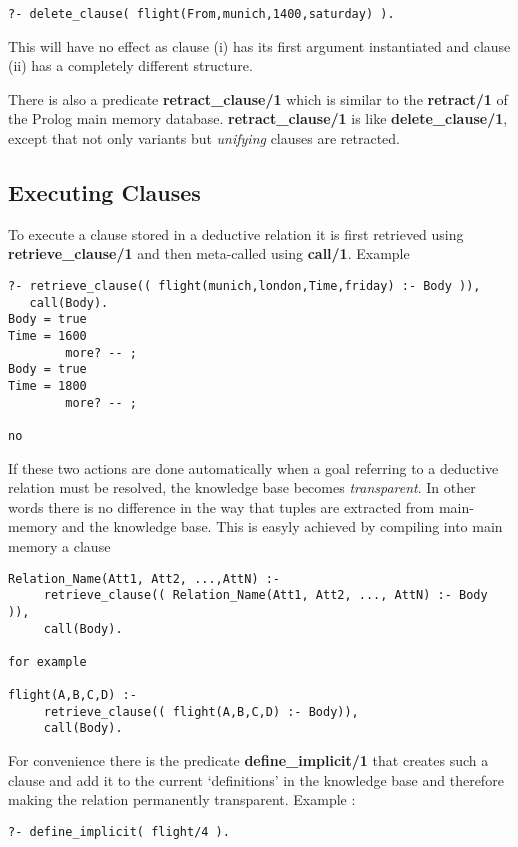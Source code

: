 \begin{verbatim}
?- delete_clause( flight(From,munich,1400,saturday) ). 
\end{verbatim}
This will have no effect as clause (i) has its first argument instantiated
and clause (ii) has a completely different structure. 

There is also a predicate {\bf retract\_clause/1} which is similar
to the {\bf retract/1} of the Prolog main memory database. 
{\bf retract\_clause/1} is like {\bf delete\_clause/1}, except that
not only variants but {\em unifying} clauses are retracted.

\subsection{Executing Clauses}

To execute a clause stored in a deductive relation it is first retrieved
using {\bf retrieve_clause/1} and then meta-called using {\bf call/1}.
Example 

\begin{verbatim}
?- retrieve_clause(( flight(munich,london,Time,friday) :- Body )), 
   call(Body).
Body = true
Time = 1600
        more? -- ;
Body = true
Time = 1800
        more? -- ;

no
\end{verbatim}

If these two actions are done automatically when a goal referring 
to a deductive relation must be resolved, the knowledge base
becomes {\em transparent}.  In other words there is no difference
in the way that tuples are extracted from main-memory and the
knowledge base. This is easyly achieved by compiling into main
memory a clause
\begin{verbatim}
Relation_Name(Att1, Att2, ...,AttN) :- 
     retrieve_clause(( Relation_Name(Att1, Att2, ..., AttN) :- Body )),
     call(Body).

for example 

flight(A,B,C,D) :- 
     retrieve_clause(( flight(A,B,C,D) :- Body)),
     call(Body).
\end{verbatim}

For convenience there is the predicate {\bf define\_implicit/1}
that creates such a clause and add it to the current `definitions'
in the knowledge base and therefore 
making the relation permanently transparent. Example :
\begin{verbatim}
?- define_implicit( flight/4 ).
\end{verbatim}


